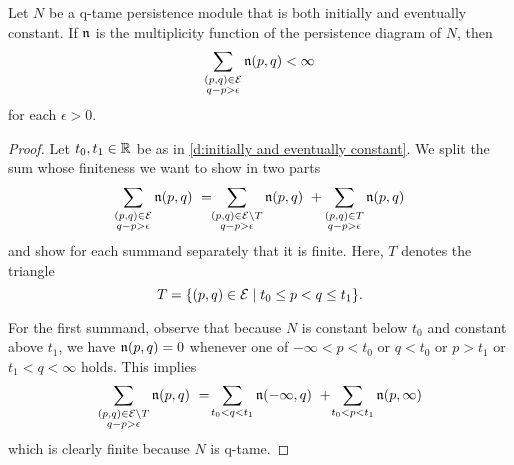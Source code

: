 \begin{thm} \label{t:cap numbers well defined}
	Let $N$ be a q-tame persistence module that is both initially and eventually constant.
	If $\mathfrak{n}$ is the multiplicity function of the persistence diagram of $N$,
	then 
	\begin{equation*}
	\sum_{ \substack{ (p,q) \in \mathcal{E} \\ q-p > \epsilon } } \mathfrak{n} (p,q) < \infty
	\end{equation*}
	for each $\epsilon > 0$.
\end{thm}

\begin{proof}
	Let $t_0, t_1 \in \mathbb{R}$ be as in \cref{d:initially and eventually constant}.
	We split the sum whose finiteness we want to show in two parts
	\begin{equation*}
	\sum_{ \substack{ (p,q) \in \mathcal{E} \\ q-p > \epsilon } } \mathfrak{n} (p,q)
	\ = \!\!
	\sum_{ \substack{ (p,q) \in \mathcal{E} \setminus T \\ q-p > \epsilon } } \mathfrak{n} (p,q)
	\ +
	\sum_{ \substack{ (p,q) \in T \\ q-p > \epsilon } } \mathfrak{n} (p,q)
	\end{equation*}
	and show for each summand separately that it is finite.
	Here, $T$ denotes the triangle
	\begin{equation*}
	T = \{(p,q) \in \mathcal{E} \mid t_0 \leq p < q \leq t_1\}.
	\end{equation*}
	
	For the first summand, observe that because $N$ is constant below $t_0$ and constant above $t_1$, we have $\mathfrak{n}(p,q) = 0$ whenever one of $-\infty < p < t_0$ or $q < t_0$ or $p > t_1$ or $t_1 < q < \infty$ holds.
	This implies 
	\begin{equation*}
	\sum_{ \substack{ (p,q) \in \mathcal{E} \setminus T \\ q-p > \epsilon } } \mathfrak{n} (p,q)
	\ = \!
	\sum_{t_0 < q < t_1} \mathfrak{n} (-\infty,q)
	\ + \!
	\sum_{t_0 < p < t_1} \mathfrak{n} (p, \infty)
	\end{equation*}
	which is clearly finite because $N$ is q-tame.
	

\end{proof}
